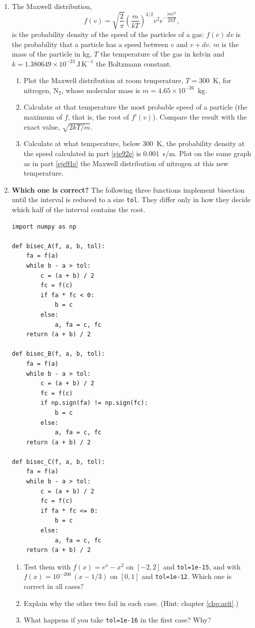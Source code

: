 \begin{enumerate}
\item The Maxwell distribution,
\begin{equation*}
f(v) = \sqrt{\frac{2}{\pi}}\left( \frac{m}{kT}\right)^{3/2}v^2e^{-\dfrac{\scriptstyle mv^2}{\scriptstyle 2kT}},
\end{equation*}
is the probability density of the speed of the particles of a gas: $f(v)\,dv$ is the probability that a particle has a speed between $v$ and $v+dv$. $m$ is the mass of the particle in kg, $T$ the temperature of the gas in kelvin and $k =1.380649\times 10^{-23}\ \text{J}\,\text{K}^{-1}$ the Boltzmann constant.
\begin{enumerate}
\item \label{eje91e}Plot the Maxwell distribution at room temperature, $T = 300$~K, for nitrogen, N$_2$, whose molecular mass is $m = 4.65 \times 10^{-26}$~kg.
\item \label{eje92e}Calculate at that temperature the most probable speed of a particle (the maximum of $f$, that is, the root of $f'(v)$). Compare the result with the exact value, $\sqrt{2kT/m}$.
\item Calculate at what temperature, below 300~K, the probability density at the speed calculated in part \ref{eje92e} is $0.001$~s/m. Plot on the same graph as in part \ref{eje91e} the Maxwell distribution of nitrogen at this new temperature.
\end{enumerate}

\item \label{ej:signo-en} \textbf{Which one is correct?} The following three functions implement bisection until the interval is reduced to a size \texttt{tol}. They differ only in how they decide which half of the interval contains the root.
\begin{verbatim}
import numpy as np

def bisec_A(f, a, b, tol):
    fa = f(a)
    while b - a > tol:
        c = (a + b) / 2
        fc = f(c)
        if fa * fc < 0:
            b = c
        else:
            a, fa = c, fc
    return (a + b) / 2

def bisec_B(f, a, b, tol):
    fa = f(a)
    while b - a > tol:
        c = (a + b) / 2
        fc = f(c)
        if np.sign(fa) != np.sign(fc):
            b = c
        else:
            a, fa = c, fc
    return (a + b) / 2

def bisec_C(f, a, b, tol):
    fa = f(a)
    while b - a > tol:
        c = (a + b) / 2
        fc = f(c)
        if fa * fc <= 0:
            b = c
        else:
            a, fa = c, fc
    return (a + b) / 2
\end{verbatim}
\begin{enumerate}
\item Test them with $f(x)=e^x-x^2$ on $[-2,2]$ and \texttt{tol=1e-15}, and with $f(x)=10^{-200}\,(x-1/3)$ on $[0,1]$ and \texttt{tol=1e-12}. Which one is correct in all cases?
\item Explain why the other two fail in each case. (Hint: chapter \ref{chp:arit}.)
\item What happens if you take \texttt{tol=1e-16} in the first case? Why?
\end{enumerate}


\end{enumerate}
